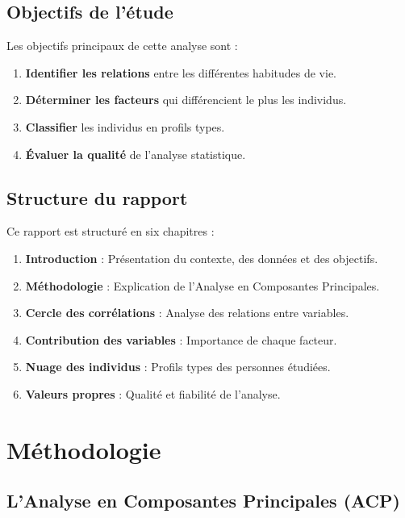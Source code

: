 \documentclass[12pt,a4paper]{book}
\begin{document}
	\vspace{0.5cm}
	
	\section{Objectifs de l'étude}
	
	Les objectifs principaux de cette analyse sont :
	
	\begin{enumerate}
		\item \textbf{Identifier les relations} entre les différentes habitudes de vie.
		\item \textbf{Déterminer les facteurs} qui différencient le plus les individus.
		\item \textbf{Classifier} les individus en profils types.
		\item \textbf{Évaluer la qualité} de l'analyse statistique.
	\end{enumerate}
	
	\section{Structure du rapport}
	
	Ce rapport est structuré en six chapitres :
	
	\begin{enumerate}
		\item \textbf{Introduction} : Présentation du contexte, des données et des objectifs.
		\item \textbf{Méthodologie} : Explication de l'Analyse en Composantes Principales.
		\item \textbf{Cercle des corrélations} : Analyse des relations entre variables.
		\item \textbf{Contribution des variables} : Importance de chaque facteur.
		\item \textbf{Nuage des individus} : Profils types des personnes étudiées.
		\item \textbf{Valeurs propres} : Qualité et fiabilité de l'analyse.
	\end{enumerate}
	
	\chapter{Méthodologie}
	
	\section{L'Analyse en Composantes Principales (ACP)}
	
\end{document}
